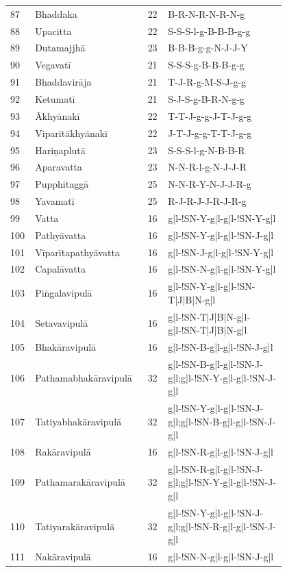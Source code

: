 {\begin{longtable}[c]{p{0.04\linewidth}p{0.30\linewidth}p{0.06\linewidth}p{0.40\linewidth}}
87 & Bhaddaka & 22 & B-R-N-R-N-R-N-g \\
88 & Upacitta & 22 & S-S-S-l-g-B-B-B-g-g \\
89 & Dutamajjhā & 23 & B-B-B-g-g-N-J-J-Y \\
90 & Vegavatī & 21 & S-S-S-g-B-B-B-g-g \\
91 & Bhaddavirāja & 21 & T-J-R-g-M-S-J-g-g \\
92 & Ketumatī & 21 & S-J-S-g-B-R-N-g-g \\
93 & Ākhyānakī & 22 & T-T-J-g-g-J-T-J-g-g \\
94 & Viparītākhyānakī & 22 & J-T-J-g-g-T-T-J-g-g \\
95 & Hariṇaplutā & 23 & S-S-S-l-g-N-B-B-R \\
96 & Aparavatta & 23 & N-N-R-l-g-N-J-J-R \\
97 & Pupphitaggā & 25 & N-N-R-Y-N-J-J-R-g \\
98 & Yavamatī & 25 & R-J-R-J-J-R-J-R-g \\
99 & Vatta & 16 & g|l-!SN-Y-g|l-g|l-!SN-Y-g|l \\
100 & Pathyāvatta & 16 & g|l-!SN-Y-g|l-g|l-!SN-J-g|l \\
101 & Vīparītapathyāvatta & 16 & g|l-!SN-J-g|l-g|l-!SN-Y-g|l \\
102 & Capalāvatta & 16 & g|l-!SN-N-g|l-g|l-!SN-Y-g|l \\
103 & Piṅgalavipulā & 16 & g|l-!SN-Y-g|l-g|l-!SN-T|J|B|N-g|l \\
104 & Setavavipulā & 16 & g|l-!SN-T|J|B|N-g|l-g|l-!SN-T|J|B|N-g|l \\
105 & Bhakāravipulā & 16 & g|l-!SN-B-g|l-g|l-!SN-J-g|l \\
106 & \mbox{Pathamabhakāravipulā} & 32 & g|l-!SN-B-g|l-g|l-!SN-J-g|l;\newline g|l-!SN-Y-g|l-g|l-!SN-J-g|l \\
107 & Tatiyabhakāravipulā & 32 & g|l-!SN-Y-g|l-g|l-!SN-J-g|l;\newline g|l-!SN-B-g|l-g|l-!SN-J-g|l \\
108 & Rakāravipulā & 16 & g|l-!SN-R-g|l-g|l-!SN-J-g|l \\
109 & Pathamarakāravipulā & 32 & g|l-!SN-R-g|l-g|l-!SN-J-g|l;\newline g|l-!SN-Y-g|l-g|l-!SN-J-g|l \\
110 & Tatiyarakāravipulā & 32 & g|l-!SN-Y-g|l-g|l-!SN-J-g|l;\newline g|l-!SN-R-g|l-g|l-!SN-J-g|l \\
111 & Nakāravipulā & 16 & g|l-!SN-N-g|l-g|l-!SN-J-g|l \\

\end{longtable}}
